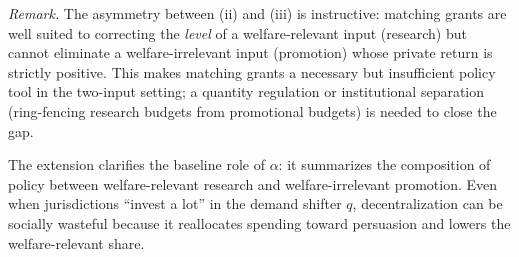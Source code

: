\noindent\textit{Remark.}
The asymmetry between (ii) and (iii) is instructive: matching grants are well suited to correcting the \emph{level} of a welfare-relevant input (research) but cannot eliminate a welfare-irrelevant input (promotion) whose private return is strictly positive. This makes matching grants a necessary but insufficient policy tool in the two-input setting; a quantity regulation or institutional separation (ring-fencing research budgets from promotional budgets) is needed to close the gap.

The extension clarifies the baseline role of $\alpha$: it summarizes the composition of policy between welfare-relevant research and welfare-irrelevant promotion. Even when jurisdictions ``invest a lot'' in the demand shifter $q$, decentralization can be socially wasteful because it reallocates spending toward persuasion and lowers the welfare-relevant share.

